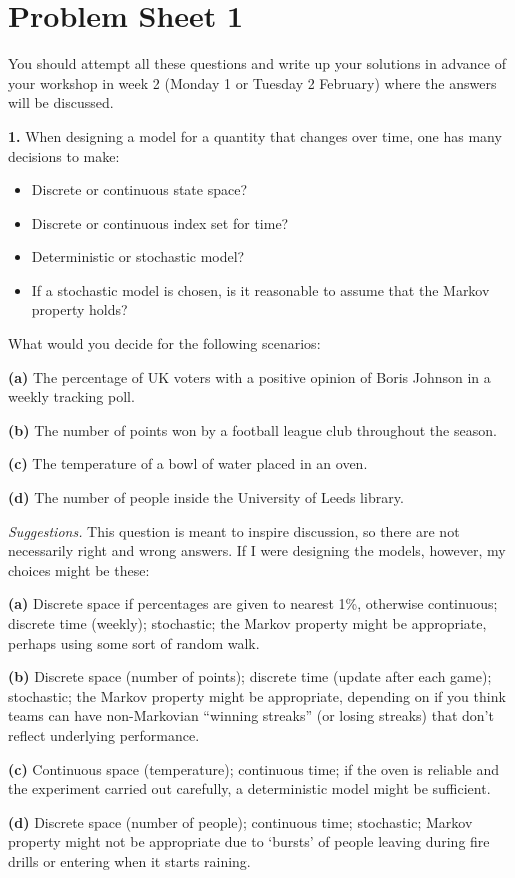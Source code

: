 \documentclass[
  a4paper,
]{article}
\providecommand{\tightlist}{%
  \setlength{\itemsep}{0pt}\setlength{\parskip}{0pt}}
\newif\ifcomm\commtrue
\theoremstyle{definition}
\theoremstyle{definition}
\theoremstyle{definition}
\theoremstyle{remark}
\begin{document}
\hypertarget{P01}{%
\section*{Problem Sheet 1}\label{P01}}

\commtrue

You should attempt all these questions and write up your solutions in advance of your workshop in week 2 (Monday 1 or Tuesday 2 February) where the answers will be discussed.

\textbf{1.} When designing a model for a quantity that changes over time, one has many decisions to make:

\begin{itemize}
\tightlist
\item
  Discrete or continuous state space?
\item
  Discrete or continuous index set for time?
\item
  Deterministic or stochastic model?
\item
  If a stochastic model is chosen, is it reasonable to assume that the Markov property holds?
\end{itemize}

What would you decide for the following scenarios:

\textbf{(a)} The percentage of UK voters with a positive opinion of Boris Johnson in a weekly tracking poll.

\textbf{(b)} The number of points won by a football league club throughout the season.

\textbf{(c)} The temperature of a bowl of water placed in an oven.

\textbf{(d)} The number of people inside the University of Leeds library.

\begin{myanswers}
\emph{Suggestions.} This question is meant to inspire discussion, so there are not necessarily right and wrong answers. If I were designing the models, however, my choices might be these:

\textbf{(a)} Discrete space if percentages are given to nearest 1\%, otherwise continuous; discrete time (weekly); stochastic; the Markov property might be appropriate, perhaps using some sort of random walk.

\textbf{(b)} Discrete space (number of points); discrete time (update after each game); stochastic; the Markov property might be appropriate, depending on if you think teams can have non-Markovian ``winning streaks'' (or losing streaks) that don't reflect underlying performance.

\textbf{(c)} Continuous space (temperature); continuous time; if the oven is reliable and the experiment carried out carefully, a deterministic model might be sufficient.

\textbf{(d)} Discrete space (number of people); continuous time; stochastic; Markov property might not be appropriate due to `bursts' of people leaving during fire drills or entering when it starts raining.

\end{myanswers}
\end{document}
